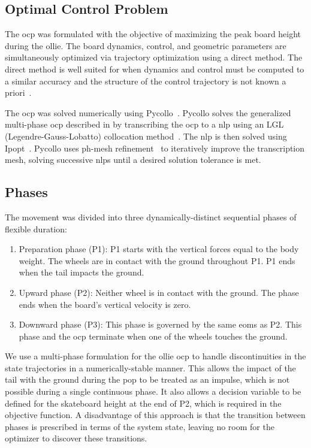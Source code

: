 \documentclass[default,iicol]{sn-jnl}
\begin{document}
\subsection{Optimal Control Problem} \label{sec:ocp}
The \gls{ocp} was formulated with the objective of maximizing the peak board height during the ollie. The board dynamics, control, and geometric parameters are simultaneously optimized via trajectory optimization using a direct method.
The direct method is well suited for when dynamics and control must be computed to a similar accuracy and the structure of the control trajectory is not known a priori~\cite{kelly_introduction_2017}.

The \gls{ocp} was solved numerically using Pycollo~\cite{brockie_predictive_2021}. Pycollo solves the generalized multi-phase \gls{ocp} described in \citet{betts_practical_2010} by transcribing the \gls{ocp} to a \gls{nlp} using an LGL (Legendre-Gauss-Lobatto) collocation method~\cite{betts_using_2016}. The \gls{nlp} is then solved using Ipopt~\cite{biegler_large-scale_2009}. Pycollo uses ph-mesh refinement~\cite{patterson_ph_2015} to iteratively improve the transcription mesh, solving successive \glspl{nlp} until a desired solution tolerance is met.

\subsection{Phases} \label{s_phases}

The movement was divided into three dynamically-distinct sequential phases of flexible duration:
\begin{enumerate} \label{n_phases}
  \item Preparation phase (P1): P1 starts with the vertical forces equal to the body weight. The wheels are in contact with the ground throughout P1. P1 ends when the tail impacts the ground.
  \item Upward phase (P2): Neither wheel is in contact with the ground. The phase ends when the board's vertical velocity is zero.
  \item Downward phase (P3): This phase is governed by the same \glspl{eom} as P2. This phase and the \gls{ocp} terminate when one of the wheels touches the ground.
\end{enumerate}

We use a multi-phase formulation for the ollie \gls{ocp} to handle discontinuities in the state trajectories in a numerically-stable manner. This allows the impact of the tail with the ground during the pop to be treated as an impulse, which is not possible during a single continuous phase. It also allows a decision variable to be defined for the skateboard height at the end of P2, which is required in the objective function. A disadvantage of this approach is that the transition between phases is prescribed in terms of the system state, leaving no room for the optimizer to discover these transitions.
\end{document}
